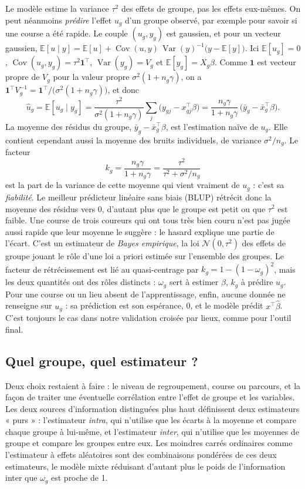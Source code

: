 \documentclass[11pt,a4paper]{article}
\newcommand{\E}{\mathbb{E}}
\DeclareMathOperator{\Var}{Var}
\DeclareMathOperator{\Cov}{Cov}
\begin{document}
Le modèle estime la variance $\tau^2$ des effets de groupe, pas les effets eux-mêmes. On peut néanmoins
\emph{prédire} l'effet $u_g$ d'un groupe observé, par exemple pour savoir si une course a été rapide. Le couple
$(u_g, y_g)$ est gaussien, et pour un vecteur gaussien,
$\E[u \mid y] = \E[u] + \Cov(u, y)\,\Var(y)^{-1}\big(y - \E[y]\big)$. Ici $\E[u_g] = 0$,
$\Cov(u_g, y_g) = \tau^2\mathbf 1^\top$, $\Var(y_g) = V_g$ et $\E[y_g] = X_g\beta$. Comme $\mathbf 1$ est vecteur
propre de $V_g$ pour la valeur propre $\sigma^2(1 + n_g\gamma)$, on a
$\mathbf 1^\top V_g^{-1} = \mathbf 1^\top/\big(\sigma^2(1 + n_g\gamma)\big)$, et donc
\begin{equation}\label{eq:blup}
\hat u_g = \E[u_g \mid y_g] = \frac{\tau^2}{\sigma^2(1 + n_g\gamma)}\sum_j\big(y_{gj} - x_{gj}^\top\beta\big)
= \frac{n_g\gamma}{1 + n_g\gamma}\,\big(\bar y_g - \bar x_g^\top\beta\big) .
\end{equation}
La moyenne des résidus du groupe, $\bar y_g - \bar x_g^\top\beta$, est l'estimation naïve de $u_g$. Elle contient
cependant aussi la moyenne des bruits individuels, de variance $\sigma^2/n_g$. Le facteur
\[
k_g = \frac{n_g\gamma}{1 + n_g\gamma} = \frac{\tau^2}{\tau^2 + \sigma^2/n_g}
\]
est la part de la variance de cette moyenne qui vient vraiment de $u_g$ : c'est sa \emph{fiabilité}. Le meilleur
prédicteur linéaire sans biais (BLUP) rétrécit donc la moyenne des résidus vers 0, d'autant plus que le groupe est
petit ou que $\tau^2$ est faible. Une course de trois coureurs qui ont tous très bien couru n'est pas jugée aussi
rapide que leur moyenne le suggère : le hasard explique une partie de l'écart. C'est un estimateur de \emph{Bayes
empirique}, la loi $\mathcal N(0, \tau^2)$ des effets de groupe jouant le rôle d'une loi a priori estimée sur
l'ensemble des groupes. Le facteur de rétrécissement est lié au quasi-centrage par $k_g = 1 - (1 - \omega_g)^2$, mais
les deux quantités ont des rôles distincts : $\omega_g$ sert à estimer $\beta$, $k_g$ à prédire $u_g$. Pour une
course ou un lieu absent de l'apprentissage, enfin, aucune donnée ne renseigne sur $u_g$ : sa prédiction est son
espérance, 0, et le modèle prédit $x^\top\hat\beta$. C'est toujours le cas dans notre validation croisée par lieux,
comme pour l'outil final.

\subsection{Quel groupe, quel estimateur ?}\label{sec:quel_estimateur}

Deux choix restaient à faire : le niveau de regroupement, course ou parcours, et la façon de traiter une éventuelle
corrélation entre l'effet de groupe et les variables. Les deux sources d'information distinguées plus haut
définissent deux estimateurs « purs » : l'estimateur \emph{intra}, qui n'utilise que les écarts à la moyenne et
compare chaque groupe à lui-même, et l'estimateur \emph{inter}, qui n'utilise que les moyennes de groupe et compare
les groupes entre eux. Les moindres carrés ordinaires comme l'estimateur à effets aléatoires sont des combinaisons
pondérées de ces deux estimateurs, le modèle mixte réduisant d'autant plus le poids de l'information inter que
$\omega_g$ est proche de 1.
\end{document}
